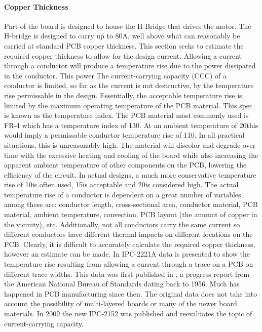 \paragraph{Copper Thickness}
Part of the board is designed to house the H-Bridge that drives the motor.
The H-bridge is designed to carry up to 80A, well above what can reasonably be carried at standard PCB copper thickness.
This section seeks to estimate the required copper thickness to allow for the design current.
Allowing a current through a conductor will produce a temperature rise due to the power dissipated in the conductor.
This power
The current-carrying capacity (CCC) of a conductor is limited, so far as the current is not destructive, by the temperature rise permissable in the design.
Essentially, the acceptable temperature rise is limited by the maximum operating temperature of the PCB material.
This spec is known as the temperature index.
The PCB material most commonly used is FR-4 which has a temperature index of 130\degree.
At an ambient temperature of 20\degree this would imply a permissable conductor temperature rise of 110\degree.
In all practical situations, this is unreasonably high.
The material will discolor and degrade over time with the excessive heating and cooling of the board while also increasing the apparent ambient temperature of other components on the PCB, lowering the efficiency of the circuit.
In actual designs, a much more conservative temperature rise of 10\degree is often used, 15\degree is acceptable and 20\degree is considered high.
The actual temperature rise of a conductor is dependent on a great number of variables, among these are: conductor length, cross-sectional area, conductor material, PCB material, ambient temperature, convection, PCB layout (the amount of copper in the vicinity), etc.
Additionally, not all conductors carry the same current so different conductors have different thermal impacts on different locations on the PCB.
Clearly, it is difficult to accurately calculate the required copper thickness, however an estimate can be made.
In IPC-2221A \cite{ipc2221} data is presented to show the temperature rise resulting from allowing a current through a trace on a PCB on different trace widths.
This data was first published in \cite{conduct}, a progress report from the American National Bureau of Standards dating back to 1956.
Much has happened in PCB manufacturing since then. 
The original data does not take into account the possibility of multi-layered boards or many of the newer board materials.
In 2009 the new IPC-2152 \cite{ipc2152} was published and reevaluates the topic of current-carrying capacity.
